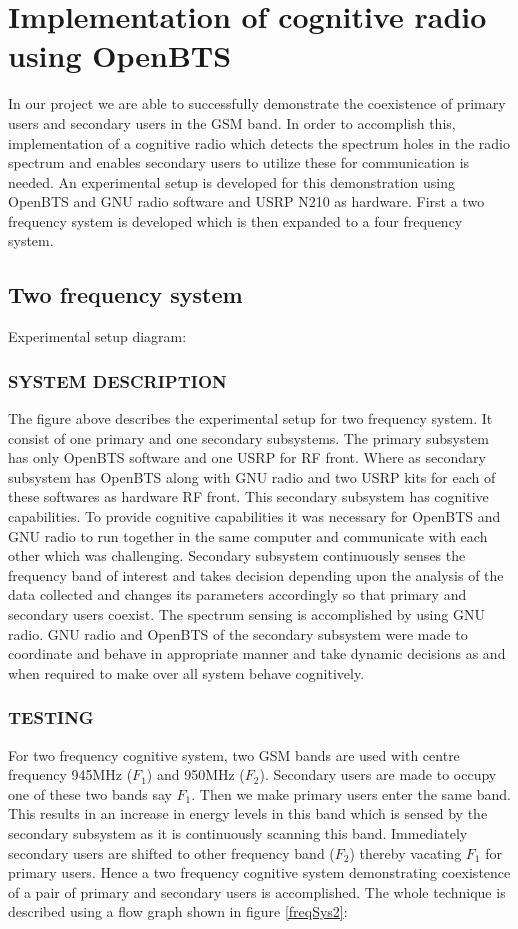 \chapter{Implementation of cognitive radio using OpenBTS}

In our project we are able to successfully demonstrate the coexistence of 
primary users and secondary users in the GSM band. In order to accomplish this, 
implementation of a cognitive radio which detects the spectrum holes in the 
radio spectrum and enables secondary users to utilize these for communication 
is needed. An experimental setup is developed for this demonstration using 
OpenBTS and GNU radio software and USRP N210 as hardware. First a two frequency 
system is developed which is then expanded to a four frequency system.


\section{Two frequency system}

Experimental setup diagram:

\subsection{SYSTEM DESCRIPTION}
The figure above describes the experimental setup for two frequency system. It 
consist of one primary and one secondary subsystems. The primary subsystem has 
only OpenBTS software and one USRP for RF front. Where as secondary subsystem 
has OpenBTS along with GNU radio and two USRP kits for each of these softwares 
as hardware RF front. This secondary subsystem has cognitive capabilities. To 
provide cognitive capabilities it was necessary for OpenBTS and GNU radio to run 
together in the same computer and communicate with each other which was challenging. 
Secondary subsystem continuously senses the frequency band of interest and  
takes decision depending upon the analysis of the data collected and changes 
its parameters accordingly so that primary and secondary users coexist. The 
spectrum sensing is accomplished by using GNU radio.  GNU radio and 
OpenBTS of the secondary subsystem were made to coordinate and behave in appropriate manner and take dynamic decisions 
as and when required to make over all system behave cognitively.

\subsection{TESTING}
For two frequency cognitive system, two GSM bands are used with centre 
frequency 945MHz ($F_1$) and 950MHz ($F_2$). Secondary users are made to occupy 
one of these two bands say $F_1$. Then we make primary users enter the same 
band. This results in an increase in energy levels in this band which is sensed 
by the secondary subsystem as it is continuously scanning this band. 
Immediately secondary users are shifted to other frequency band ($F_2$) thereby 
vacating $F_1$ for primary users. Hence a two frequency cognitive system 
demonstrating coexistence of a pair of primary and secondary users is 
accomplished. 
The whole technique is described using a flow graph shown in figure
\ref{freqSys2}:

